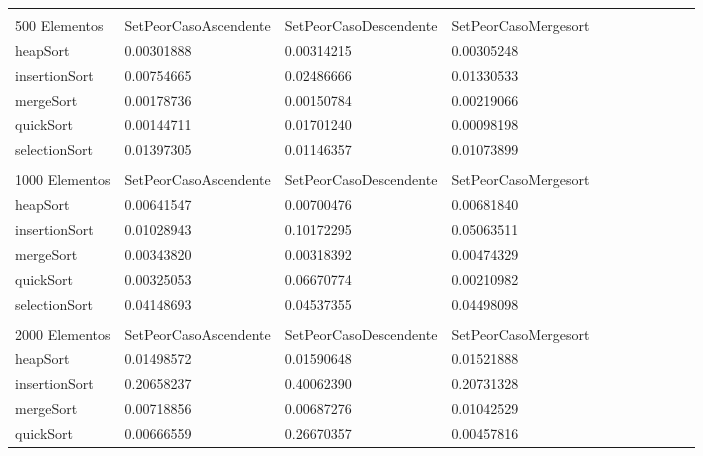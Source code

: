 \documentclass[article,a4paper]{article}
\begin{document}
\begin{table}[h]
\begin{adjustbox}{width=\textwidth,totalheight=\textheight,keepaspectratio}
\begin{tabular}{lllllllllll}
                &                       &                        &                      \\
500 Elementos   & SetPeorCasoAscendente & SetPeorCasoDescendente & SetPeorCasoMergesort \\
heapSort        & 0.00301888            & 0.00314215             & 0.00305248           \\
insertionSort   & 0.00754665            & 0.02486666             & 0.01330533           \\
mergeSort       & 0.00178736            & 0.00150784             & 0.00219066           \\
quickSort       & 0.00144711            & 0.01701240             & 0.00098198           \\
selectionSort   & 0.01397305            & 0.01146357             & 0.01073899           \\
                &                       &                        &                      \\
1000 Elementos  & SetPeorCasoAscendente & SetPeorCasoDescendente & SetPeorCasoMergesort \\
heapSort        & 0.00641547            & 0.00700476             & 0.00681840           \\
insertionSort   & 0.01028943            & 0.10172295             & 0.05063511           \\
mergeSort       & 0.00343820            & 0.00318392             & 0.00474329           \\
quickSort       & 0.00325053            & 0.06670774             & 0.00210982           \\
selectionSort   & 0.04148693            & 0.04537355             & 0.04498098           \\
                &                       &                        &                      \\
2000 Elementos  & SetPeorCasoAscendente & SetPeorCasoDescendente & SetPeorCasoMergesort \\
heapSort        & 0.01498572            & 0.01590648             & 0.01521888           \\
insertionSort   & 0.20658237            & 0.40062390             & 0.20731328           \\
mergeSort       & 0.00718856            & 0.00687276             & 0.01042529           \\
quickSort       & 0.00666559            & 0.26670357             & 0.00457816           \\

\end{tabular}
\end{adjustbox}
\end{table}
\end{document}

